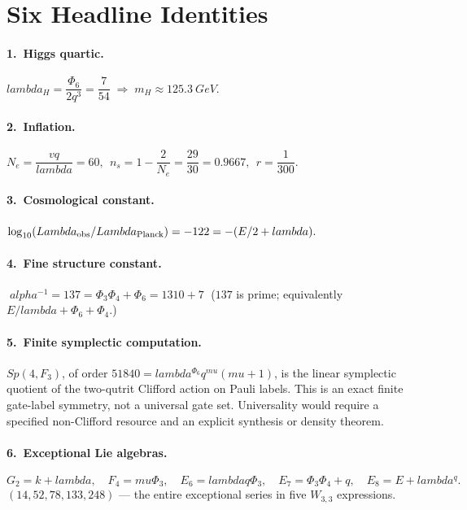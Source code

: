 \documentclass[12pt,a4paper]{article}
\def\mathbb#1{#1}%
\def\mathrm#1{#1}%
\def\alpha{alpha}%
\def\lambda{lambda}%
\def\Lambda{Lambda}%
\def\mu{mu}%
\def\Phi#1{Phi#1}%
\def\cdot{ }%
\theoremstyle{definition}
\newcommand{\Sp}{\mathrm{Sp}}
\newcommand{\FF}{\mathbb{F}}
\begin{document}
\section{Six Headline Identities}

\paragraph{1.\ Higgs quartic.}
\(
\lambda_H = \dfrac{\Phi_6}{2q^{3}} = \dfrac{7}{54}\;\Longrightarrow\;m_H \approx 125.3\ \mathrm{GeV}.
\)

\paragraph{2.\ Inflation.}
\(
N_e=\dfrac{vq}{\lambda}=60,\ \ n_s = 1-\dfrac{2}{N_e} = \dfrac{29}{30} = 0.9667,\ \ r=\dfrac{1}{300}.
\)

\paragraph{3.\ Cosmological constant.}
\(
\log_{10}(\Lambda_{\rm obs}/\Lambda_{\rm Planck}) = -122 = -(E/2+\lambda).
\)

\paragraph{4.\ Fine structure constant.}
\(
\boxed{\;\alpha^{-1} = 137 = \Phi_3\Phi_4 + \Phi_6 = 13\cdot 10 + 7\;}
\)
($137$ is prime; equivalently $E/\lambda + \Phi_6+\Phi_4$.)

\paragraph{5.\ Finite symplectic computation.}
$\Sp(4,\FF_3)$, of order
$51840=\lambda^{\Phi_6}q^{\mu}(\mu+1)$, is the linear symplectic
quotient of the two-qutrit Clifford action on Pauli labels.  This is an
exact finite gate-label symmetry, not a universal gate set.  Universality
would require a specified non-Clifford resource and an explicit synthesis
or density theorem.

\paragraph{6.\ Exceptional Lie algebras.}
\[
G_2=k+\lambda,\quad F_4=\mu\Phi_3,\quad E_6=\lambda q\Phi_3,\quad
E_7=\Phi_3\Phi_4+q,\quad E_8=E+\lambda^q.
\]
$(14,52,78,133,248)$ --- the entire exceptional series in five
$W_{3,3}$ expressions.
\end{document}
